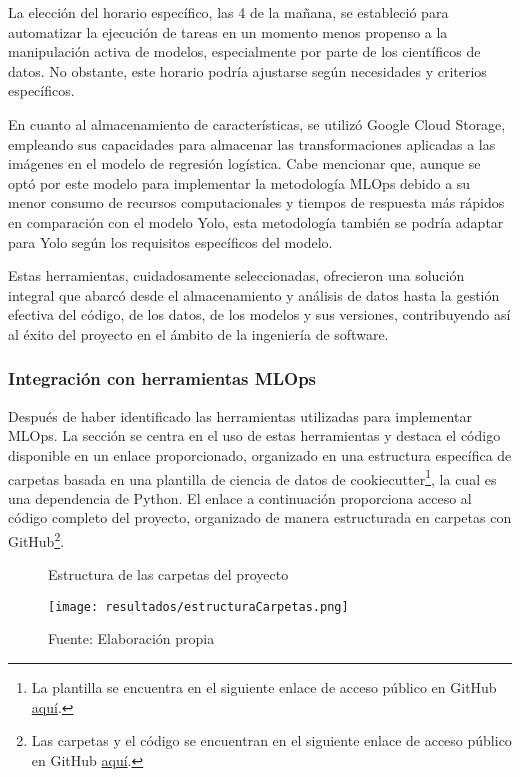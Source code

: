 La elección del horario específico, las 4 de la mañana, se estableció para automatizar la ejecución de tareas en un momento menos propenso a la manipulación activa de modelos, especialmente por parte de los científicos de datos. No obstante, este horario podría ajustarse según necesidades y criterios específicos. \newline

En cuanto al almacenamiento de características, se utilizó Google Cloud Storage, empleando sus capacidades para almacenar las transformaciones aplicadas a las imágenes en el modelo de regresión logística. Cabe mencionar que, aunque se optó por este modelo para implementar la metodología MLOps debido a su menor consumo de recursos computacionales y tiempos de respuesta más rápidos en comparación con el modelo Yolo, esta metodología también se podría adaptar para Yolo según los requisitos específicos del modelo. \newline

\newpage

Estas herramientas, cuidadosamente seleccionadas, ofrecieron una solución integral que abarcó desde el almacenamiento y análisis de datos hasta la gestión efectiva del código, de los datos, de los modelos y sus versiones, contribuyendo así al éxito del proyecto en el ámbito de la ingeniería de software.

\subsubsection{Integración con herramientas MLOps}

Después de haber identificado las herramientas utilizadas para implementar MLOps. La sección se centra en el uso de estas herramientas y destaca el código disponible en un enlace proporcionado, organizado en una estructura específica de carpetas basada en una plantilla de ciencia de datos de cookiecutter\footnote{La plantilla se encuentra en el siguiente enlace de acceso público en GitHub \href{https://github.com/khuyentran1401/data-science-template/tree/dvc-pip}{aquí}.}, la cual es una dependencia de Python. El enlace a continuación proporciona acceso al código completo del proyecto, organizado de manera estructurada en carpetas con GitHub\footnote{Las carpetas y el código se encuentran en el siguiente enlace de acceso público en GitHub \href{https://github.com/juferoto/mlops_project}{aquí}.}.

\begin{figure}[h]
\centering
\caption{Estructura de las carpetas del proyecto}
\texttt{[image: resultados/estructuraCarpetas.png]}
\caption*{\footnotesize Fuente: Elaboración propia}
\label{fig:figuraEstructuraCarpetas}
\end{figure}

